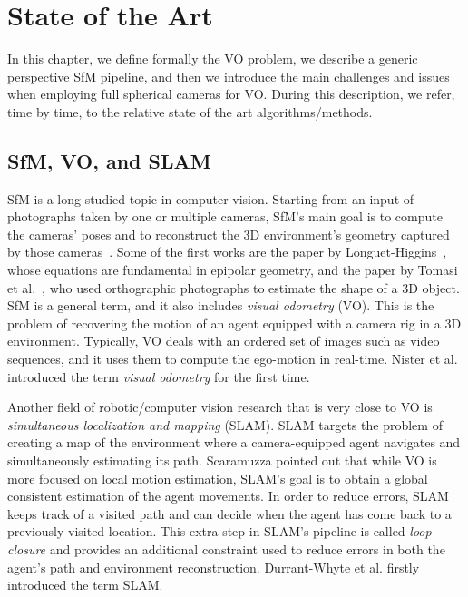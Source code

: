 \chapter{State of the Art}
\label{ch:state_of_the_art}
%
In this chapter, we define formally the VO problem, we describe a generic perspective SfM pipeline, 
and then we introduce the main challenges and issues when employing full spherical cameras for VO.
During this description, we refer, time by time, to the relative state of the art algorithms/methods.

%

\section{SfM, VO, and SLAM}\label{sec:sfm_vo_slam}
SfM is a long-studied topic in computer vision. Starting from an input of photographs taken by one or multiple cameras, SfM's main goal is to compute the cameras' poses and to reconstruct the 3D environment's geometry captured by those cameras~\cite{szeliski2010computer}.
%
Some of the first works are the paper by Longuet-Higgins~\cite{longuet1981computer}, whose equations are fundamental in epipolar geometry, and the paper by Tomasi et al.~\cite{tomasi1992shape}, who used orthographic photographs to estimate the shape of a 3D object.
%
SfM is a general term, and it also includes \textit{visual odometry} (VO). This is the problem of recovering the motion of an agent equipped with a camera rig in a 3D environment. Typically, VO deals with an ordered set of images such as video sequences, and it uses them to compute the ego-motion in real-time. Nister et al.\cite{nister2004visual} introduced the term \textit{visual odometry} for the first time.

Another field of robotic/computer vision research that is very close to VO is \textit{simultaneous localization and mapping} (SLAM). SLAM targets the problem of creating a map of the environment where a camera-equipped agent navigates and simultaneously estimating its path. Scaramuzza\cite{scaramuzzaVisualOdometryI} pointed out that while VO is more focused on local motion estimation, SLAM's goal is to obtain a global consistent estimation of the agent movements.
%
In order to reduce errors, SLAM keeps track of a visited path and can decide when the agent has come back to a previously visited location. This extra step in SLAM's pipeline is called \textit{loop closure} and provides an additional constraint used to reduce errors in both the agent's path and 
environment reconstruction. Durrant-Whyte et al.\cite{durrant1996localization} firstly introduced the term SLAM.
 
